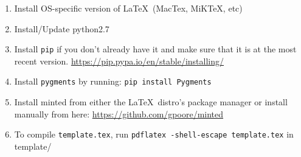 \documentclass[11pt,fleqn]{article}
\begin{document}
\begin{enumerate}
\item
Install OS-specific version of \LaTeX\ (MacTex, MiKTeX, etc)

\item
Install/Update python2.7

\item
Install \texttt{pip} if you don't already have it and make sure that it is at the most recent
version. \url{https://pip.pypa.io/en/stable/installing/}

\item
Install \texttt{pygments} by running: \texttt{pip install Pygments}

\item
Install minted from either the \LaTeX\ distro's package manager or install manually from here: 
\url{https://github.com/gpoore/minted}

\item
To compile \texttt{template.tex}, run \texttt{pdflatex -shell-escape template.tex} in template/
\end{enumerate}
\end{document}
